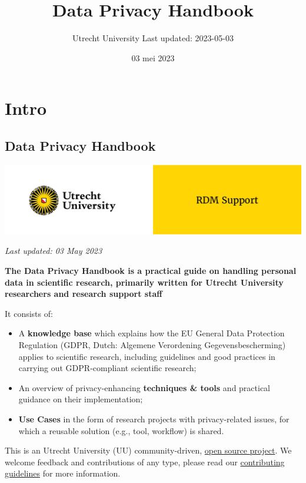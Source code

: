 \documentclass[
]{book}
\title{Data Privacy Handbook}
\author{Utrecht University \textbar{} Last updated: 2023-05-03}
\date{03 mei 2023}
\providecommand{\tightlist}{%
  \setlength{\itemsep}{0pt}\setlength{\parskip}{0pt}}
\begin{document}
\maketitle

{
\setcounter{tocdepth}{1}
\tableofcontents
}
\hypertarget{part-intro}{%
\part*{Intro}\label{part-intro}}

\hypertarget{data-privacy-handbook}{%
\chapter*{Data Privacy Handbook}\label{data-privacy-handbook}}

\includegraphics{img/cover-image-dph.png}

\emph{Last updated: 03 May 2023}

\textbf{The Data Privacy Handbook is a practical guide on handling personal data in
scientific research, primarily written for Utrecht University researchers and
research support staff}

It consists of:

\begin{itemize}
\tightlist
\item
  A \textbf{knowledge base} which explains how the EU General Data Protection
  Regulation (GDPR, Dutch: Algemene Verordening Gegevensbescherming) applies to
  scientific research, including guidelines and good practices in carrying out
  GDPR-compliant scientific research;
\item
  An overview of privacy-enhancing \textbf{techniques \& tools} and practical guidance
  on their implementation;
\item
  \textbf{Use Cases} in the form of research projects with privacy-related issues,
  for which a reusable solution (e.g., tool, workflow) is shared.
\end{itemize}

This is an Utrecht University (UU) community-driven,
\href{https://github.com/UtrechtUniversity/dataprivacyhandbook}{open source project}.
We welcome feedback and contributions of any type, please read our
\href{https://github.com/UtrechtUniversity/dataprivacyhandbook/blob/main/CONTRIBUTING.md}{contributing guidelines}
for more information.
\end{document}
